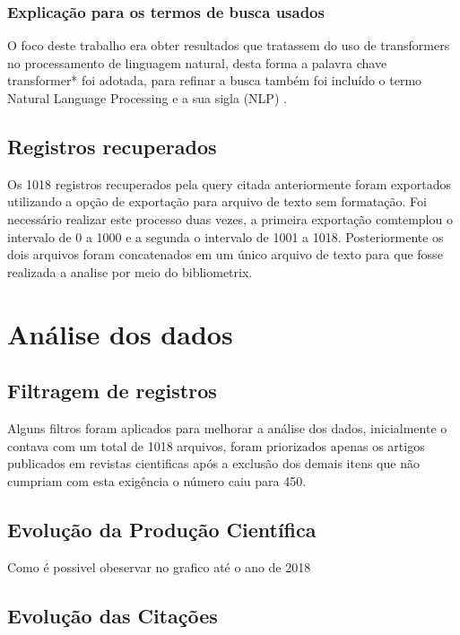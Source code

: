 \subsubsection{Explicação para os termos de busca usados}
O foco deste trabalho era obter resultados que tratassem do uso de transformers no processamento de linguagem natural, desta forma a palavra chave transformer* foi adotada, para refinar a busca também foi incluído o termo Natural Language Processing e a sua sigla (NLP) .

\subsection{Registros recuperados}
Os 1018 registros recuperados pela query citada anteriormente foram exportados utilizando a opção de exportação para arquivo de texto sem formatação. Foi necessário realizar este processo duas vezes, a primeira exportação comtemplou o intervalo de 0 a 1000 e a segunda o intervalo de 1001 a 1018. Posteriormente os dois arquivos foram concatenados em um único arquivo de texto para que fosse realizada a analise por meio do bibliometrix. 

\section{Análise dos dados}

\subsection{Filtragem de registros}
Alguns filtros foram aplicados para melhorar a análise dos dados, inicialmente o \dataset contava com um total de 1018 arquivos, foram priorizados apenas os artigos publicados em revistas cientificas após a exclusão dos demais itens que não cumpriam com esta exigência o número caiu para 450. 

\subsection{Evolução da Produção Científica}

Como é possivel obeservar no grafico até o ano de 2018

\subsection{Evolução das Citações}

